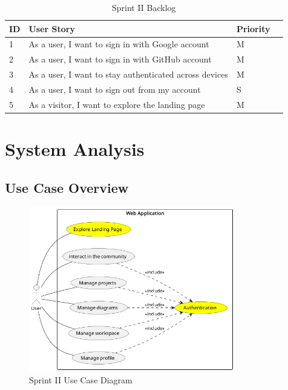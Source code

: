 \begin{table}[H]
\centering
\caption{Sprint II Backlog}
\begin{tabular}{|p{1cm}|p{7cm}|p{2cm}|p{2cm}|}
\hline
\textbf{ID} & \textbf{User Story} & \textbf{Priority} \\
\hline
1 & As a user, I want to sign in with Google account & M\\
\hline
2 & As a user, I want to sign in with GitHub account & M\\
\hline
3 & As a user, I want to stay authenticated across devices & M\\
\hline
4 & As a user, I want to sign out from my account & S\\
\hline
5 & As a visitor, I want to explore the landing page & M\\
\hline
\end{tabular}
\end{table}
\section{System Analysis}

\subsection{Use Case Overview}
\begin{figure}[H]
    \centering
    \includegraphics[width=0.8\textwidth]{conception/SprintII/use_case_diagrams/use_case_diagram_of_SprintII.png}
    \caption{Sprint II Use Case Diagram}
    \label{fig:usecase_sprint2}
\end{figure}
\newpage
